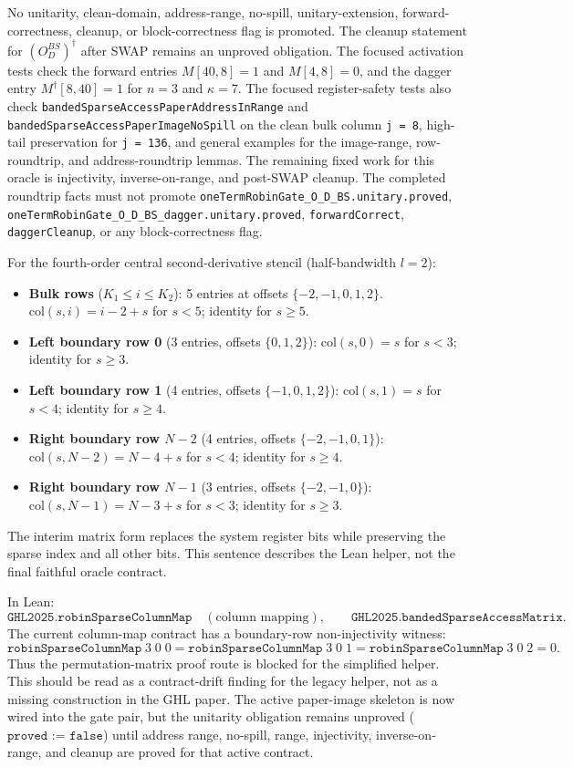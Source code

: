 No unitarity, clean-domain, address-range, no-spill, unitary-extension,
forward-correctness, cleanup, or block-correctness flag is promoted.  The
cleanup statement for $(O_D^{BS})^\dagger$ after SWAP remains an unproved
obligation.  The focused activation tests check the forward entries
$M[40,8]=1$ and $M[4,8]=0$, and the dagger entry $M^\dagger[8,40]=1$ for
$n=3$ and $\kappa=7$.  The focused register-safety tests also check
\texttt{bandedSparseAccessPaperAddressInRange} and
\texttt{bandedSparseAccessPaperImageNoSpill} on the clean bulk column
\texttt{j = 8}, high-tail preservation for \texttt{j = 136}, and general
examples for the image-range, row-roundtrip, and address-roundtrip lemmas.
The remaining fixed work for this oracle is injectivity, inverse-on-range, and
post-SWAP cleanup.  The completed roundtrip facts must not promote
\texttt{oneTermRobinGate\_O\_D\_BS.unitary.proved},
\texttt{oneTermRobinGate\_O\_D\_BS\_dagger.unitary.proved},
\texttt{forwardCorrect}, \texttt{daggerCleanup}, or any block-correctness flag.

For the fourth-order central second-derivative stencil (half-bandwidth $l=2$):
\begin{itemize}
  \item \textbf{Bulk rows} ($K_1 \leq i \leq K_2$): 5 entries at offsets $\{-2,-1,0,1,2\}$.
    $\mathrm{col}(s,i) = i - 2 + s$ for $s < 5$; identity for $s \geq 5$.
  \item \textbf{Left boundary row 0} (3 entries, offsets $\{0,1,2\}$):
    $\mathrm{col}(s,0) = s$ for $s < 3$; identity for $s \geq 3$.
  \item \textbf{Left boundary row 1} (4 entries, offsets $\{-1,0,1,2\}$):
    $\mathrm{col}(s,1) = s$ for $s < 4$; identity for $s \geq 4$.
  \item \textbf{Right boundary row $N{-}2$} (4 entries, offsets $\{-2,-1,0,1\}$):
    $\mathrm{col}(s,N{-}2) = N{-}4+s$ for $s < 4$; identity for $s \geq 4$.
  \item \textbf{Right boundary row $N{-}1$} (3 entries, offsets $\{-2,-1,0\}$):
    $\mathrm{col}(s,N{-}1) = N{-}3+s$ for $s < 3$; identity for $s \geq 3$.
\end{itemize}

The interim matrix form replaces the system register bits while preserving the
sparse index and all other bits.  This sentence describes the Lean helper, not
the final faithful oracle contract.

In Lean:
\[
  \texttt{GHL2025.robinSparseColumnMap} \quad (\text{column mapping}),
  \qquad
  \texttt{GHL2025.bandedSparseAccessMatrix}.
\]
The current column-map contract has a boundary-row non-injectivity witness:
\[
  \texttt{robinSparseColumnMap}\;3\;0\;0
  =
  \texttt{robinSparseColumnMap}\;3\;0\;1
  =
  \texttt{robinSparseColumnMap}\;3\;0\;2
  =
  0.
\]
Thus the permutation-matrix proof route is blocked for the simplified helper.
This should be read as a contract-drift finding for the legacy helper, not as a
missing construction in the GHL paper.  The active paper-image skeleton is now
wired into the gate pair, but the unitarity obligation remains unproved
($\texttt{proved := false}$) until address range, no-spill, range,
injectivity, inverse-on-range, and cleanup are proved for that active contract.

